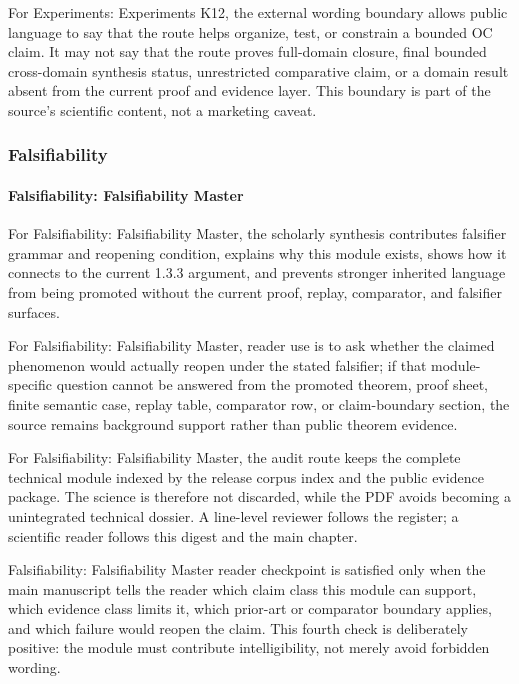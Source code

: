 For Experiments: Experiments K12, the external wording boundary allows public language to say that the route helps organize, test, or constrain a bounded OC claim. It may not say that the route proves full-domain closure, final bounded cross-domain synthesis status, unrestricted comparative claim, or a domain result absent from the current proof and evidence layer. This boundary is part of the source's scientific content, not a marketing caveat.


\subsubsection{Falsifiability}

\paragraph{Falsifiability: Falsifiability Master}

For Falsifiability: Falsifiability Master, the scholarly synthesis contributes falsifier grammar and reopening condition, explains why this module exists, shows how it connects to the current 1.3.3 argument, and prevents stronger inherited language from being promoted without the current proof, replay, comparator, and falsifier surfaces.


For Falsifiability: Falsifiability Master, reader use is to ask whether the claimed phenomenon would actually reopen under the stated falsifier; if that module-specific question cannot be answered from the promoted theorem, proof sheet, finite semantic case, replay table, comparator row, or claim-boundary section, the source remains background support rather than public theorem evidence.


For Falsifiability: Falsifiability Master, the audit route keeps the complete technical module indexed by the release corpus index and the public evidence package. The science is therefore not discarded, while the PDF avoids becoming a unintegrated technical dossier. A line-level reviewer follows the register; a scientific reader follows this digest and the main chapter.


Falsifiability: Falsifiability Master reader checkpoint is satisfied only when the main manuscript tells the reader which claim class this module can support, which evidence class limits it, which prior-art or comparator boundary applies, and which failure would reopen the claim. This fourth check is deliberately positive: the module must contribute intelligibility, not merely avoid forbidden wording.


